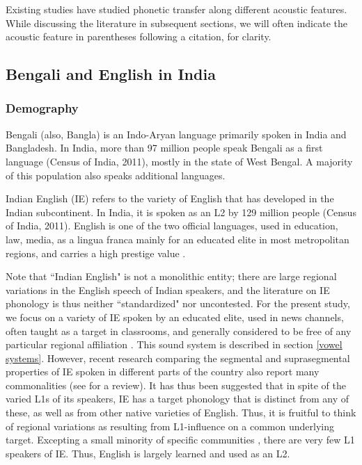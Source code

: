 \documentclass[12 pt]{article}
\begin{document}
Existing studies have studied phonetic transfer along different acoustic features. While discussing the literature in subsequent sections, we will often indicate the acoustic feature in parentheses following a citation, for clarity. 

\subsection{Bengali and English in India} \label{bengali_english_in_india}

\subsubsection*{Demography} 

Bengali (also, Bangla) is an Indo-Aryan language primarily spoken in India and Bangladesh. In India, more than 97 million people speak Bengali as a first language (Census of India, 2011), mostly in the state of West Bengal. A majority of this population also speaks additional languages.

Indian English (IE) refers to the variety of English that has developed in the Indian subcontinent. In India, it is spoken as an L2 by 129 million people (Census of India, 2011).  English is one of the two official languages, used in education, law, media, as a lingua franca mainly for an educated elite in most metropolitan regions, and carries a high prestige value \citep{pandey201517, kachru1981english, tollefson2014language, kachru1983indianization}.

Note that ``Indian English" is not a monolithic entity; there are large regional variations in the English speech of Indian speakers, and the literature on IE phonology is thus neither ``standardized" nor uncontested. For the present study, we focus on a variety of IE spoken by an educated elite, used in news channels, often taught as a target in classrooms, and generally considered to be free of any particular regional affiliation \citep[c.f.][who reports this variety to be ``a \textit{de-facto} norm", and thus calls it General(ized) Indian English]{masica1972sound}. This sound system is described in section \ref{vowel systems}. However, recent research comparing the segmental and suprasegmental properties of IE spoken in different parts of the country also report many commonalities (see \cite{sirsa2013effects} for a review). It has thus been suggested that in spite of the varied L1s of its speakers, IE has a target phonology that is distinct from any of these, as well as from other native varieties of English. Thus, it is fruitful to think of regional variations as resulting from L1-influence on a common underlying target. Excepting a small minority of specific communities \citep{pandey201517, wells1982accents, coelho1997anglo}, there are very few L1 speakers of IE. Thus, English is largely learned and used as an L2.
\end{document}
